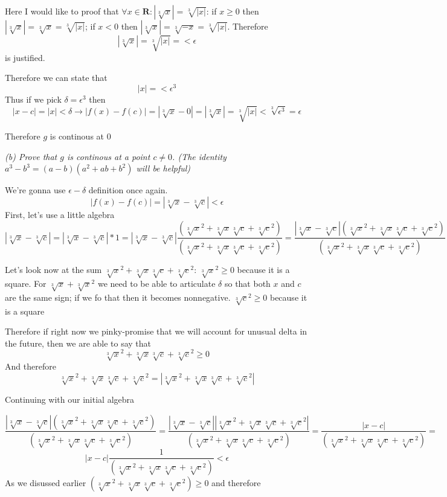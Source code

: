 \documentclass[11pt,oneside,titlepage]{book}
\begin{document}
Here I would like to proof that $ \forall x \in \textbf{R}: |\sqrt[3]{x}| = \sqrt[3]{|x|}$: 
if $x \geq 0$ then $|\sqrt[3]{x}| = \sqrt[3]{x}= \sqrt[3]{|x|}$;
if $x < 0$ then $|\sqrt[3]{x}| = \sqrt[3]{-x}= \sqrt[3]{|x|}$. Therefore 
$$ |\sqrt[3]{x}| = \sqrt[3]{|x|} =  < \epsilon $$ is justified.

Therefore we can state that 
$$|x| =  < \epsilon ^ 3$$ 
Thus if we pick $\delta = \epsilon ^ 3$ then
$$|x - c| = |x| < \delta \to |f(x) - f(c)| = |\sqrt[3]{x} - 0| = |\sqrt[3]{x}|
= \sqrt[3]{|x|} < \sqrt[3]{\epsilon^3} =  \epsilon $$

Therefore $g$ is continous at 0

\textit{(b) Prove that $g$ is continous at a point $c \neq 0$. (The identity
  $a^3 - b^3 = (a - b)(a ^ 2 + ab + b^2)$ will be helpful)}

We're gonna use $\epsilon-\delta$ definition once again.
$$|f(x) - f(c)| = |\sqrt[3]{x} - \sqrt[3]{c}| < \epsilon$$
First, let's use a little algebra
$$|\sqrt[3]{x} - \sqrt[3]{c}| = |\sqrt[3]{x} - \sqrt[3]{c}| * 1 =
|\sqrt[3]{x} - \sqrt[3]{c}|\frac{(\sqrt[3]{x}^2 + \sqrt[3]{x}\sqrt[3]{c} +
  \sqrt[3]{c} ^ 2)}{(\sqrt[3]{x}^2 + \sqrt[3]{x}\sqrt[3]{c}
  + \sqrt[3]{c} ^ 2)} = \frac{|\sqrt[3]{x} - \sqrt[3]{c}|(\sqrt[3]{x}^2 + \sqrt[3]{x}\sqrt[3]{c} +
  \sqrt[3]{c} ^ 2)}{(\sqrt[3]{x}^2 + \sqrt[3]{x}\sqrt[3]{c}
  + \sqrt[3]{c} ^ 2)}$$

Let's look now at the sum  $\sqrt[3]{x} ^ 2 + \sqrt[3]{x}\sqrt[3]{c} +
\sqrt[3]{c}^2$: $\sqrt[3]{x} ^ 2 \geq 0 $ because it is a square. For
$\sqrt[3]{x} + \sqrt[3]{x} ^ 2$ we need to be able to articulate $\delta$ so
that both $x$ and $c$ are the same sign; if we fo that then it becomes
nonnegative. $\sqrt[3]{c} ^ 2 \geq 0 $ because it is a square

Therefore if right now we pinky-promise that we will account for unusual delta
in the future, then we are able to say that 
$$\sqrt[3]{x} ^ 2 + \sqrt[3]{x}\sqrt[3]{c} + \sqrt[3]{c}^2 \geq 0 $$
And therefore
$$\sqrt[3]{x} ^ 2 + \sqrt[3]{x}\sqrt[3]{c} + \sqrt[3]{c}^2 =
|\sqrt[3]{x} ^ 2 + \sqrt[3]{x}\sqrt[3]{c} + \sqrt[3]{c}^2| $$

Continuing with our initial algebra

$$\frac{|\sqrt[3]{x} - \sqrt[3]{c}|(\sqrt[3]{x}^2 + \sqrt[3]{x}\sqrt[3]{c} +
  \sqrt[3]{c} ^ 2)}{(\sqrt[3]{x}^2 + \sqrt[3]{x}\sqrt[3]{c}
  + \sqrt[3]{c} ^ 2)} =
\frac{|\sqrt[3]{x} - \sqrt[3]{c}||\sqrt[3]{x}^2 + \sqrt[3]{x}\sqrt[3]{c} +
  \sqrt[3]{c} ^ 2|}{(\sqrt[3]{x}^2 + \sqrt[3]{x}\sqrt[3]{c}
  + \sqrt[3]{c} ^ 2)} =
\frac{|x - c|}{(\sqrt[3]{x}^2 + \sqrt[3]{x}\sqrt[3]{c}
  + \sqrt[3]{c} ^ 2)} =
$$
$$ |x - c|\frac{1}{(\sqrt[3]{x}^2 + \sqrt[3]{x}\sqrt[3]{c}
  + \sqrt[3]{c} ^ 2)} < \epsilon
$$
As we disussed earlier $(\sqrt[3]{x}^2 + \sqrt[3]{x}\sqrt[3]{c}  +
\sqrt[3]{c} ^ 2) \geq 0$ and therefore 
\end{document}
